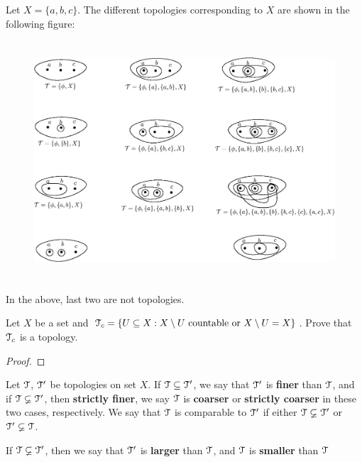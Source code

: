 \documentclass[a4paper,english,12pt]{article}   	%
\begin{document}
\begin{exmp} Let $X=\{a,b,c\}$. The different topologies corresponding to $X$ are shown in the following figure:
\begin{figure}[!h]
 \centering
 \includegraphics[height=3.5in]{fig133.eps}
\end{figure}

In the above, last two are not topologies.
\end{exmp}

\begin{exmp} 
 Let $X$ be a set and $\mathcal{T}_c=\{U\subseteq X: X \setminus U \text{ countable or } X \setminus U =X  \}$. Prove that $\mathcal{T}_c$ is a topology.
\end{exmp}
\begin{proof}
 
\end{proof}

\begin{defn}
 Let $\mathcal{T}$, $\mathcal{T}'$ be topologies on set $X$. If $\mathcal{T}\subseteq\mathcal{T}'$, we say that $\mathcal{T}'$ is \textbf{finer} than $\mathcal{T}$, and if  $\mathcal{T}\varsubsetneq\mathcal{T}'$, then \textbf{strictly finer}, we say $\mathcal{T}$ is \textbf{coarser} or \textbf{strictly coarser} in these two cases, respectively. We say that $\mathcal{T}$ is comparable to $\mathcal{T}'$ if either
 $\mathcal{T}\varsubsetneq\mathcal{T}'$ or $\mathcal{T}' \varsubsetneq\mathcal{T}$.
\end{defn}
\begin{defn}
 If $\mathcal{T}\varsubsetneq\mathcal{T}'$, then we say that $\mathcal{T}'$ is \textbf{larger} than $\mathcal{T}$, and $\mathcal{T}$ is \textbf{smaller} than $\mathcal{T}$
\end{defn}
\end{document}
